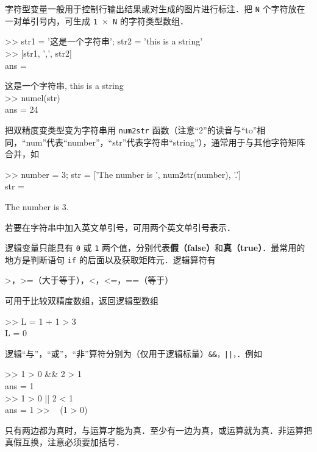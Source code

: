 字符型变量一般用于控制行输出结果或对生成的图片进行标注．把 \texttt{N} 个字符放在一对单引号内，可生成 \texttt{1 $\times$ N} 的字符类型数组．
\begin{Command}
>> str1 = '\!这是一个字符串'; str2 = 'this is a string' \\
>> [str1, ',', str2] \\
ans = \par
这是一个字符串, this is a string \\
>> numel(str) \\
ans = 24
\end{Command}
把双精度变类型变为字符串用 \texttt{num2str} 函数（注意“2”的读音与“to”相同，“num”代表“number”，“str”代表字符串“string”），通常用于与其他字符矩阵合并，如
\begin{Command}
>> number = 3; str = ['The number is ', num2str(number), '.'] \\
str = \par
The number is 3.
\end{Command}
若要在字符串中加入英文单引号，可用两个英文单引号表示．

逻辑变量只能具有 \texttt{0} 或 \texttt{1} 两个值，分别代表\textbf{假（false）}和\textbf{真（true）}．最常用的地方是判断语句 \texttt{if} 的后面以及获取矩阵元．逻辑算符有
\begin{Command}
>，>=（大于等于），<，<=，==（等于）
\end{Command}
可用于比较双精度数组，返回逻辑型数组
\begin{Command}
>> L = 1 + 1 > 3 \\
L = 0
\end{Command}
逻辑“与”，“或”，“非”算符分别为（仅用于逻辑标量）\texttt{\&\&，||，\texttilde}．例如
\begin{Command}
>> 1 > 0 \&\& 2 > 1 \\
ans = 1 \\
>> 1 > 0 || 2 < 1 \\
ans = 1
>> ~ (1 > 0)
\end{Command}
只有两边都为真时，与运算才能为真．至少有一边为真，或运算就为真．非运算把真假互换，注意必须要加括号．

